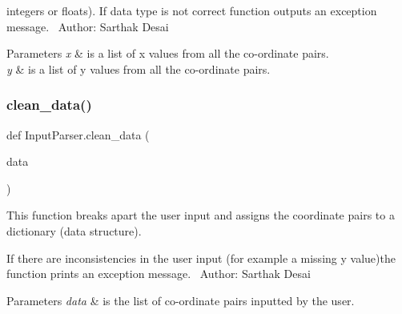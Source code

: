 integers or floats). If data type is not correct function outputs an exception message.~\newline
 Author\+: Sarthak Desai~\newline
 
\begin{DoxyParams}{Parameters}
{\em x} & is a list of x values from all the co-\/ordinate pairs. \\
\hline
{\em y} & is a list of y values from all the co-\/ordinate pairs. \\
\hline
\end{DoxyParams}
\hypertarget{namespace_input_parser_a78eaa27b614b5d2df44f32bc64d545d3}{}\label{namespace_input_parser_a78eaa27b614b5d2df44f32bc64d545d3} 
\subsubsection{\texorpdfstring{clean\+\_\+data()}{clean\_data()}}
{\footnotesize\ttfamily def Input\+Parser.\+clean\+\_\+data (\begin{DoxyParamCaption}\item[{}]{data }\end{DoxyParamCaption})}



This function breaks apart the user input and assigns the coordinate pairs to a dictionary (data structure). 

If there are inconsistencies in the user input (for example a missing y value)the function prints an exception message.~\newline
 Author\+: Sarthak Desai~\newline
 
\begin{DoxyParams}{Parameters}
{\em data} & is the list of co-\/ordinate pairs inputted by the user. \\
\hline
\end{DoxyParams}
